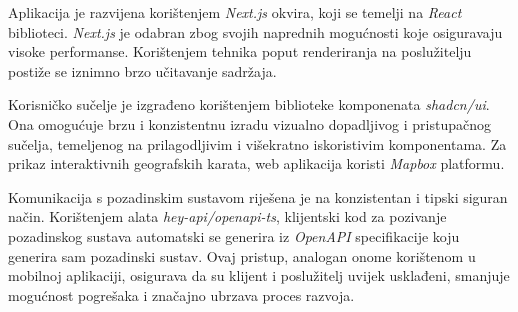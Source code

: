 Aplikacija je razvijena korištenjem \textit{Next.js} okvira, koji se temelji na \textit{React} biblioteci. \textit{Next.js} je odabran zbog svojih naprednih mogućnosti koje osiguravaju visoke performanse. Korištenjem tehnika poput renderiranja na poslužitelju postiže se iznimno brzo učitavanje sadržaja.

Korisničko sučelje je izgrađeno korištenjem biblioteke komponenata \textit{shadcn/ui}. Ona omogućuje brzu i konzistentnu izradu vizualno dopadljivog i pristupačnog sučelja, temeljenog na prilagodljivim i višekratno iskoristivim komponentama. Za prikaz interaktivnih geografskih karata, web aplikacija koristi \textit{Mapbox} platformu.

Komunikacija s pozadinskim sustavom riješena je na konzistentan i tipski siguran način. Korištenjem alata \textit{hey-api/openapi-ts}, klijentski kod za pozivanje pozadinskog sustava automatski se generira iz \textit{OpenAPI} specifikacije koju generira sam pozadinski sustav. Ovaj pristup, analogan onome korištenom u mobilnoj aplikaciji, osigurava da su klijent i poslužitelj uvijek usklađeni, smanjuje mogućnost pogrešaka i značajno ubrzava proces razvoja.